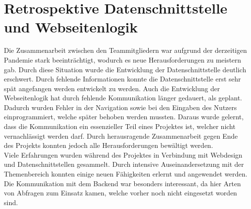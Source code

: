 \section{Retrospektive Datenschnittstelle und Webseitenlogik}
Die Zusammenarbeit zwischen den Teammitgliedern war aufgrund der derzeitigen Pandemie stark beeinträchtigt, wodurch es neue Herausforderungen zu meistern gab. Durch diese Situation wurde die Entwicklung der Datenschnittstelle deutlich erschwert. Durch fehlende Informationen konnte die Datenschnittstelle erst sehr spät angefangen werden entwickelt zu werden. Auch die Entwicklung der Webseitenlogik hat durch fehlende Kommunikation länger gedauert, als geplant. Dadurch wurden Fehler in der Navigation sowie bei den Eingaben des Nutzers einprogrammiert, welche später behoben werden mussten. Daraus wurde gelernt, dass die Kommunikation ein essenzieller Teil eines Projektes ist, welcher nicht vernachlässigt werden darf. Durch herausragende Zusammenarbeit gegen Ende des Projekts konnten jedoch alle Herausforderungen bewältigt werden.\\
Viele Erfahrungen wurden während des Projektes in Verbindung mit Webdesign und Datenschnittstellen gesammelt. Durch intensive Auseinandersetzung mit der Themenbereich konnten einige neuen Fähigkeiten erlernt und angewendet werden. Die Kommunikation mit dem Backend war besonders interessant, da hier Arten von Abfragen zum Einsatz kamen, welche vorher noch nicht eingesetzt worden sind.
